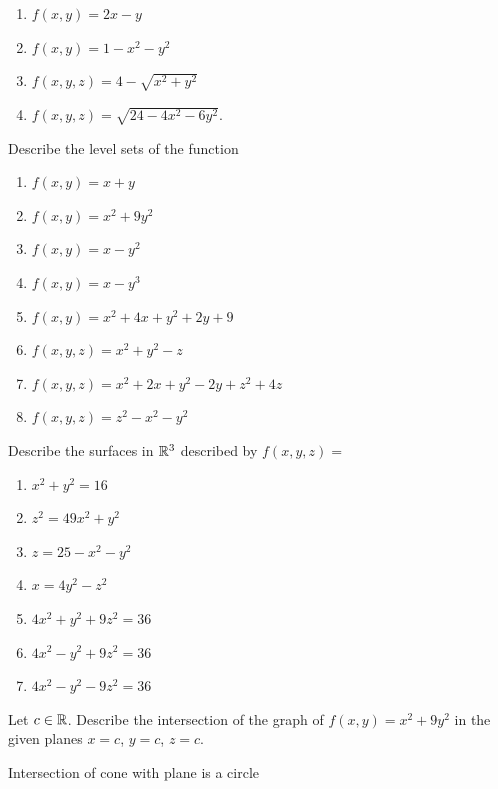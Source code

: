 \begin{exerciselist}
\begin{enumerate}[label=(\alph*)]
        \item $f(x,y)=2x-y$
        \item $f(x,y)=1-x^2-y^2$
        \item $f(x,y,z)=4-\sqrt{x^2+y^2}$
        \item $f(x,y,z)=\sqrt{24-4x^2-6y^2}$.
    \end{enumerate}
    \item Describe the level sets of the function \begin{enumerate}[label=(\alph*)]
        \item $f(x,y)=x+y$
        \item $f(x,y)=x^2+9y^2$
        \item $f(x,y)=x-y^2$
        \item $f(x,y)=x-y^3$
        \item $f(x,y)=x^2+4x+y^2+2y+9$
        \item $f(x,y,z)=x^2+y^2-z$
        \item $f(x,y,z)=x^2+2x+y^2-2y+z^2+4z$
        \item $f(x,y,z)=z^2-x^2-y^2$
    \end{enumerate}
    \item Describe the surfaces in $\mathbb{R}^3$ described by $f(x,y,z)=$ \begin{enumerate}[label=(\alph*)]
        \item $x^2+y^2=16$
        \item $z^2=49x^2+y^2$
        \item $z=25-x^2-y^2$
        \item $x=4y^2-z^2$
        \item $4x^2+y^2+9z^2=36$
        \item $4x^2-y^2+9z^2=36$
        \item $4x^2-y^2-9z^2=36$
    \end{enumerate}
    \item Let $c\in \mathbb{R}$. Describe the intersection of the graph of $f(x,y)=x^2+9y^2$ in the given planes $x=c$, $y=c$, $z=c$.
    \item \todo Intersection of cone with plane is a circle
\end{exerciselist}
